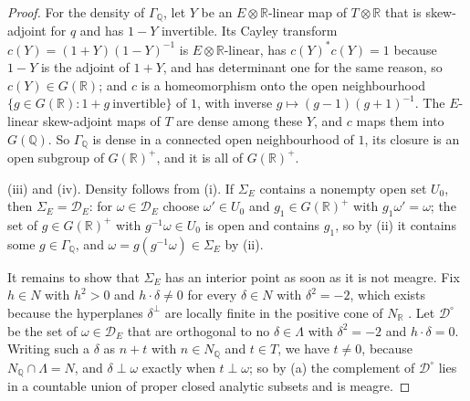 \documentclass[11pt,reqno]{amsart}
\theoremstyle{plain}
\theoremstyle{definition}
\theoremstyle{remark}
\newcommand{\QQ}{\mathbb{Q}}
\newcommand{\RR}{\mathbb{R}}
\newcommand{\cD}{\mathcal{D}}
\begin{document}
\begin{proof}
For the density of $\Gamma_{\QQ}$, let $Y$ be an $E\otimes\RR$-linear map of
$T\otimes\RR$ that is skew-adjoint for $q$ and has $1-Y$ invertible. Its
Cayley transform $c(Y)=(1+Y)(1-Y)^{-1}$ is $E\otimes\RR$-linear, has
$c(Y)^{*}c(Y)=1$ because $1-Y$ is the adjoint of $1+Y$, and has determinant
one for the same reason, so $c(Y)\in G(\RR)$; and $c$ is a homeomorphism onto
the open neighbourhood $\{g\in G(\RR):1+g\ \text{invertible}\}$ of $1$, with
inverse $g\mapsto(g-1)(g+1)^{-1}$. The $E$-linear skew-adjoint maps of $T$
are dense among these $Y$, and $c$ maps them into $G(\QQ)$. So $\Gamma_{\QQ}$
is dense in a connected open neighbourhood of $1$, its closure is an open
subgroup of $G(\RR)^{+}$, and it is all of $G(\RR)^{+}$.

(iii) and (iv). Density follows from (i). If $\Sigma_{E}$ contains a nonempty
open set $U_{0}$, then $\Sigma_{E}=\cD_{E}$: for $\omega\in\cD_{E}$ choose
$\omega'\in U_{0}$ and $g_{1}\in G(\RR)^{+}$ with $g_{1}\omega'=\omega$; the
set of $g\in G(\RR)^{+}$ with $g^{-1}\omega\in U_{0}$ is open and contains
$g_{1}$, so by (ii) it contains some $g\in\Gamma_{\QQ}$, and
$\omega=g(g^{-1}\omega)\in\Sigma_{E}$ by (ii).

It remains to show that $\Sigma_{E}$ has an interior point as soon as it is
not meagre. Fix $h\in N$ with $h^{2}>0$ and $h\cdot\delta\ne0$ for every
$\delta\in N$ with $\delta^{2}=-2$, which exists because the hyperplanes
$\delta^{\perp}$ are locally finite in the positive cone of $N_{\RR}$
\cite[Ch.~8]{Huy16}. Let $\cD^{\circ}$ be the set of $\omega\in\cD_{E}$ that
are orthogonal to no $\delta\in\Lambda$ with $\delta^{2}=-2$ and
$h\cdot\delta=0$. Writing such a $\delta$ as $n+t$ with $n\in N_{\QQ}$ and
$t\in T$, we have $t\ne0$, because $N_{\QQ}\cap\Lambda=N$, and
$\delta\perp\omega$ exactly when $t\perp\omega$; so by (a) the complement of
$\cD^{\circ}$ lies in a countable union of proper closed analytic subsets and
is meagre.


\end{proof}
\end{document}
